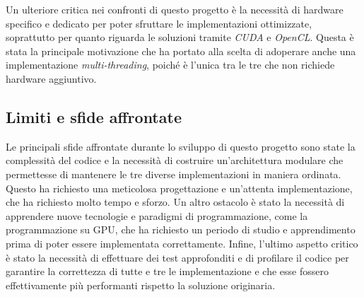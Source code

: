 Un ulteriore critica nei confronti di questo progetto è la necessità di hardware
specifico e dedicato per poter sfruttare le implementazioni ottimizzate, soprattutto
per quanto riguarda le soluzioni tramite \textit{CUDA} e \textit{OpenCL}. Questa
è stata la principale motivazione che ha portato alla scelta di adoperare anche
una implementazione \textit{multi-threading}, poiché è l'unica tra le tre che
non richiede hardware aggiuntivo.

\subsection{Limiti e sfide affrontate}
\label{subsec:limiti}

Le principali sfide affrontate durante lo sviluppo di questo progetto sono state
la complessità del codice e la necessità di costruire un'architettura modulare che
permettesse di mantenere le tre diverse implementazioni in maniera ordinata.
Questo ha richiesto una meticolosa progettazione e un'attenta implementazione, che
ha richiesto molto tempo e sforzo. Un altro ostacolo è stato la necessità di
apprendere nuove tecnologie e paradigmi di programmazione, come la programmazione
su GPU, che ha richiesto un periodo di studio e apprendimento prima di poter
essere implementata correttamente. Infine, l'ultimo aspetto critico è stato la
necessità di effettuare dei test approfonditi e di profilare il codice per
garantire la correttezza di tutte e tre le implementazione e che esse fossero
effettivamente più performanti rispetto la soluzione originaria.